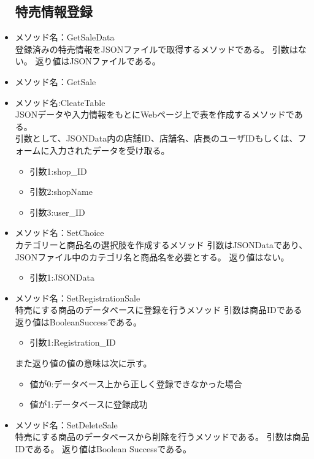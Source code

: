 \documentclass[a4j]{jarticle}
\begin{document}
\begin{itemize}
\subsection{特売情報登録}
\item メソッド名：GetSaleData\\

登録済みの特売情報をJSONファイルで取得するメソッドである。
引数はない。
返り値はJSONファイルである。

\item メソッド名：GetSale\\

\item メソッド名:CleateTable\\
JSONデータや入力情報をもとにWebページ上で表を作成するメソッドである。\\
引数として、JSONData内の店舗ID、店舗名、店長のユーザIDもしくは、フォームに入力されたデータを受け取る。
	\begin{itemize}	
		\item 引数1:shop\_ID
		\item 引数2:shopName
		\item 引数3:user\_ID
	\end{itemize}
\item メソッド名：SetChoice\\

カテゴリーと商品名の選択肢を作成するメソッド
引数はJSONDataであり、JSONファイル中のカテゴリ名と商品名を必要とする。
返り値はない。
	\begin{itemize}
		\item 引数1:JSONData
	\end{itemize}
	
\item メソッド名：SetRegistrationSale\\

特売にする商品のデータベースに登録を行うメソッド
引数は商品IDである%
返り値はBooleanSuccessである。

	\begin{itemize}
		\item 引数1:Registration\_ID
	\end{itemize}
また返り値の値の意味は次に示す。
	\begin{itemize}
		\item 値が0:データベース上から正しく登録できなかった場合
		\item 値が1:データベースに登録成功
	\end{itemize}
\item メソッド名：SetDeleteSale\\
特売にする商品のデータベースから削除を行うメソッドである。
引数は商品IDである。
返り値はBoolean Successである。


\end{itemize}
\end{document}
